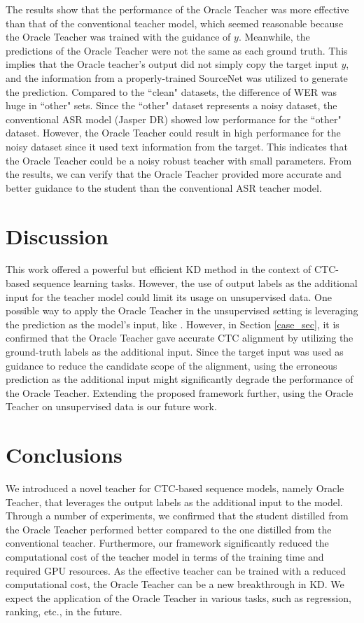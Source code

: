 \documentclass[journal]{IEEEtran}
\begin{document}
The results show that the performance of the Oracle Teacher was more effective than that of the conventional teacher model, which seemed reasonable because the Oracle Teacher was trained with the guidance of $y$.
Meanwhile, the predictions of the Oracle Teacher were not the same as each ground truth. 
This implies that the Oracle teacher's output did not simply copy the target input $y$, and the information from a properly-trained SourceNet was utilized to generate the prediction.
Compared to the ``clean" datasets, the difference of WER was huge in ``other" sets.
Since the ``other" dataset represents a noisy dataset, the conventional ASR model (Jasper DR) showed low performance for the ``other" dataset. However, the Oracle Teacher could result in high performance for the noisy dataset since it used text information from the target.
This indicates that the Oracle Teacher could be a noisy robust teacher with small parameters.
From the results, we can verify that the Oracle Teacher provided more accurate and better guidance to the student than the conventional ASR teacher model.

\section{Discussion} 
This work offered a powerful but efficient KD method in the context of CTC-based sequence learning tasks. 
However, the use of output labels as the additional input for the teacher model could limit its usage on unsupervised data. 
One possible way to apply the Oracle Teacher in the unsupervised setting is leveraging the prediction as the model's input, like \cite{target1,imputer,mask-ctc}.
However, in Section \ref{case_sec}, it is confirmed that the Oracle Teacher gave accurate CTC alignment by utilizing the ground-truth labels as the additional input.
Since the target input was used as guidance to reduce the candidate scope of the alignment, using the erroneous prediction as the additional input might significantly degrade the performance of the Oracle Teacher.
Extending the proposed framework further, using the Oracle Teacher on unsupervised data is our future work.

\section{Conclusions}
We introduced a novel teacher for CTC-based sequence models, namely Oracle Teacher, that leverages the output labels as the additional input to the model.
Through a number of experiments, we confirmed that the student distilled from the Oracle Teacher performed better compared to the one distilled from the conventional teacher.
Furthermore, our framework significantly reduced the computational cost of the teacher model in terms of the training time and required GPU resources.
As the effective teacher can be trained with a reduced computational cost, the Oracle Teacher can be a new breakthrough in KD.
We expect the application of the Oracle Teacher in various tasks, such as regression, ranking, etc., in the future.
\end{document}
